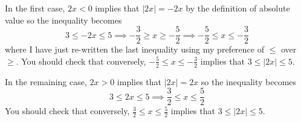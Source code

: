 \documentclass{article}
\begin{document}
\begin{enumerate}
\begin{enumerate}
    In the first case, $2x<0$ implies that
    $|2x|=-2x$ by the definition of absolute value so the inequality
    becomes
    \begin{equation*}
      3\le -2x \le 5 \implies -\frac{3}{2} \ge x \ge -\frac{5}{2}
      \implies -\frac{5}{2} \le x \le -\frac{3}{2}
    \end{equation*}
    where I have just re-written the last inequality using my
    preference of $\le$ over
    $\ge$.  You should check that conversely, $-\frac{5}{2} \le x \le
    -\frac{3}{2}$ implies that $3\le |2x| \le 5$.

    In the remaining case, $2x> 0$ implies that
    $|2x|=2x$ so the inequality becomes
    \begin{equation*}
      3\le 2x \le 5 \implies \frac{3}{2} \le x \le \frac{5}{2} 
    \end{equation*}
    You should check that conversely, $\frac{3}{2} \le x \le
    \frac{5}{2}$ implies that $3\le |2x| \le 5$.
    

\end{enumerate}
\end{enumerate}
\end{document}
